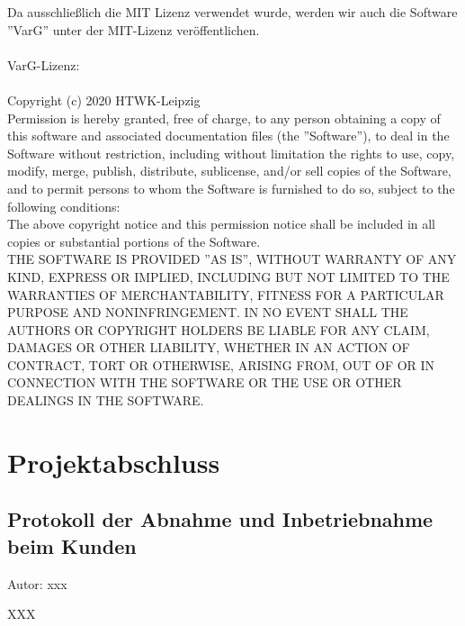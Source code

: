 \documentclass[twoside]{report}
\begin{document}
Da ausschließlich die MIT Lizenz verwendet wurde, werden wir auch die Software ''VarG'' unter der
MIT-Lizenz veröffentlichen.
\\ \\
VarG-Lizenz:
\\
\\ Copyright (c) 2020 HTWK-Leipzig
\\ Permission is hereby granted, free of charge, to any person obtaining a copy of this software and associated documentation files (the ''Software''), to deal in the Software without restriction, including without limitation the rights to use, copy, modify, merge, publish, distribute, sublicense, and/or sell copies of the Software, and to permit persons to whom the Software is furnished to do so, subject to the following conditions:
\\ The above copyright notice and this permission notice shall be included in all copies or substantial portions of the Software.
\\THE SOFTWARE IS PROVIDED ''AS IS'', WITHOUT WARRANTY OF ANY KIND, EXPRESS OR IMPLIED, INCLUDING BUT NOT LIMITED TO THE WARRANTIES OF MERCHANTABILITY, FITNESS FOR A PARTICULAR PURPOSE AND NONINFRINGEMENT. IN NO EVENT SHALL THE AUTHORS OR COPYRIGHT HOLDERS BE LIABLE FOR ANY CLAIM, DAMAGES OR OTHER LIABILITY, WHETHER IN AN ACTION OF CONTRACT, TORT OR OTHERWISE, ARISING FROM, OUT OF OR IN CONNECTION WITH THE SOFTWARE OR THE USE OR OTHER DEALINGS IN THE SOFTWARE.


\section{Projektabschluss}

\subsection{Protokoll der Abnahme und Inbetriebnahme beim Kunden}
{\small Autor: xxx}

XXX
\end{document}
